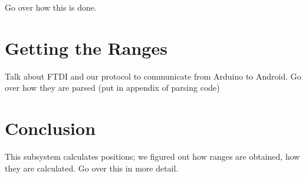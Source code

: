 Go over how this is done.

\section{Getting the Ranges}
Talk about FTDI and our protocol to communicate from Arduino to Android. Go over how they are parsed (put in appendix of parsing code)

\section{Conclusion}
This subsystem calculates positions; we figured out how ranges are obtained, how they are calculated. Go over this in more detail.